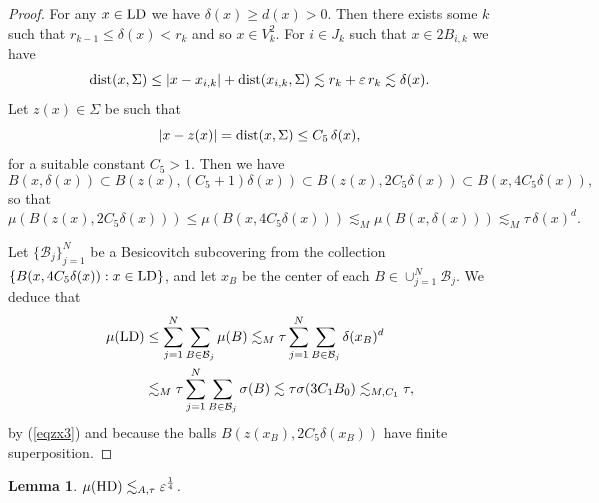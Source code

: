 \documentclass[11pt]{amsart}
\newcommand{\dist}{{\rm dist}}
\newcommand{\rf}[1]{{(\ref{#1})}}
\newcommand{\ve}{{\varepsilon}}
\newcommand{\HD}{{\mathsf{HD}}}
\newcommand{\LD}{{\mathsf{LD}}}
\newtheorem{lemma}[theorem]{Lemma}
\theoremstyle{definition}
\theoremstyle{remark}
\def\LD{{\rm LD}}
\def\HD{{\rm HD}}
\numberwithin{equation}{section}
\def\lec{\lesssim}
\def\lec{\lesssim}
\begin{document}
\begin{proof}
For any $x\in \LD$ we have $\delta(x)\geq d(x)>0$.
 Then there exists some $k$ such that $r_{k-1}\leq \delta(x) < r_{k}$ and so $x\in V_k^2$.
 For $i\in J_k $ such that $x\in 2 B_{i,k}$ we have
$$\dist(x,\Sigma)\leq |x-x_{i,k}| + \dist(x_{i,k},\Sigma)\lesssim r_k +\ve\, r_k\lesssim \delta(x).$$
Let $z(x)\in \Sigma$ be such that 
\begin{equation}\label{eqzx1}
|x-z(x)|=\dist(x,\Sigma)\leq C_5\,\delta(x),
\end{equation}
for a suitable constant $C_5>1$.
Then we have
\begin{equation}\label{eqzx2}
B(x,\delta(x))\subset B(z(x),(C_5+1)\delta(x))\subset B(z(x),2C_5\delta(x))\subset B(x,4C_5\delta(x)),
\end{equation}
so that
\begin{equation}\label{eqzx3}
\mu(B(z(x),2C_5\delta(x)))\leq \mu(B(x,4C_5\delta(x)))\lesssim_M \mu(B(x,\delta(x)))\lesssim_{M}\tau \,\delta(x)^d.
\end{equation}

Let $\{\mathcal{B}_j\}_{j=1}^{N}$ be a Besicovitch subcovering from the collection $\{B(x,4C_5\delta(x)):x\in \LD\}$, and let $x_{B}$ be
the center of each $B\in \cup_{j=1}^N\mathcal{B}_j$. 
We deduce that
\begin{align*}
\mu(\LD)&
\leq \sum_{j=1}^N\sum_{B\in\mathcal{B}_j}\mu(B) \lesssim_{M}\tau \sum_{j=1}^N\sum_{B\in\mathcal{B}_j}\delta(x_B)^d \\
&\lesssim_{M}\tau \sum_{j=1}^N\sum_{B\in\mathcal{B}_j}\sigma(B)
\lec \tau \sigma(3C_1B_{0})
\lec_{M,C_1} \tau,
\end{align*}
by \rf{eqzx3} and because the balls $B(z(x_B), 2C_5\delta(x_B))$ have finite superposition.
\end{proof}


\begin{lemma}\label{lemhd}
	$\mu(\HD)\lec_{A,\tau} \ve^{\frac{1}{4}}$. 
\end{lemma}
\end{document}
